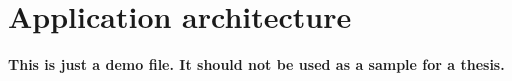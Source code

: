 \chapter{Application architecture}
\label{chapter:architecture}

\textbf{This is just a demo file. It should not be used as a sample for a thesis.}\\